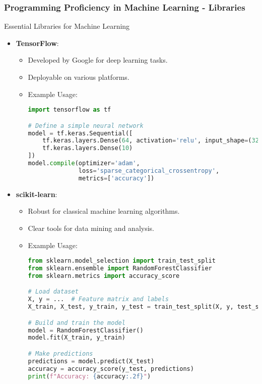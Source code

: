 \documentclass{beamer}
\begin{document}
\begin{frame}[fragile]
    \frametitle{Programming Proficiency in Machine Learning - Libraries}
    \begin{block}{Essential Libraries for Machine Learning}
        \begin{itemize}
            \item \textbf{TensorFlow}:
            \begin{itemize}
                \item Developed by Google for deep learning tasks.
                \item Deployable on various platforms.
                \item Example Usage:
                \begin{lstlisting}[language=Python]
import tensorflow as tf

# Define a simple neural network
model = tf.keras.Sequential([
    tf.keras.layers.Dense(64, activation='relu', input_shape=(32,)),
    tf.keras.layers.Dense(10)
])
model.compile(optimizer='adam', 
              loss='sparse_categorical_crossentropy', 
              metrics=['accuracy'])
                \end{lstlisting}
            \end{itemize}
            \item \textbf{scikit-learn}:
            \begin{itemize}
                \item Robust for classical machine learning algorithms.
                \item Clear tools for data mining and analysis.
                \item Example Usage:
                \begin{lstlisting}[language=Python]
from sklearn.model_selection import train_test_split
from sklearn.ensemble import RandomForestClassifier
from sklearn.metrics import accuracy_score

# Load dataset
X, y = ...  # Feature matrix and labels
X_train, X_test, y_train, y_test = train_test_split(X, y, test_size=0.2)

# Build and train the model
model = RandomForestClassifier()
model.fit(X_train, y_train)

# Make predictions
predictions = model.predict(X_test)
accuracy = accuracy_score(y_test, predictions)
print(f"Accuracy: {accuracy:.2f}")
                \end{lstlisting}
            \end{itemize}
        \end{itemize}
    \end{block}
\end{frame}
\end{document}
